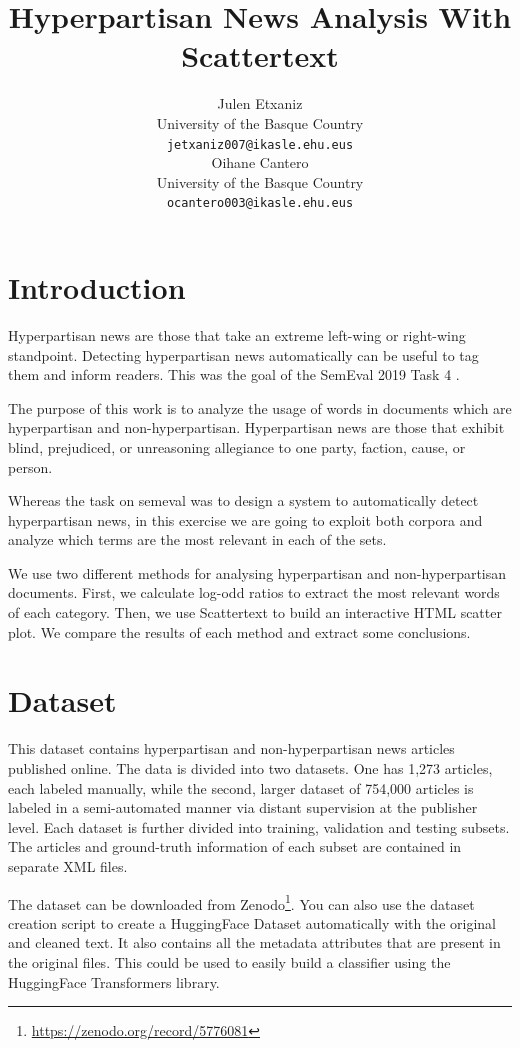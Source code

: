 \documentclass[11pt,a4paper]{article}
\title{Hyperpartisan News Analysis With Scattertext}
\author{Julen Etxaniz \\
  University of the Basque Country \\
  \texttt{jetxaniz007@ikasle.ehu.eus} \\\And
  Oihane Cantero \\
  University of the Basque Country \\
  \texttt{ocantero003@ikasle.ehu.eus} \\}
\date{}
\begin{document}
\maketitle
\begin{abstract}

\end{abstract}

\section{Introduction}

Hyperpartisan news are those that take an extreme left-wing or right-wing standpoint. Detecting hyperpartisan news automatically can be useful to tag them and inform readers. This was the goal of the SemEval 2019 Task 4 \cite{kiesel2019semeval}.

The purpose of this work is to analyze the usage of words in documents which are hyperpartisan and non-hyperpartisan. Hyperpartisan news are those that exhibit blind, prejudiced, or unreasoning allegiance to one party, faction, cause, or person.

Whereas the task on semeval was to design a system to automatically detect hyperpartisan news, in this exercise we are going to exploit both corpora and analyze which terms are the most relevant in each of the sets.

We use two different methods for analysing hyperpartisan and non-hyperpartisan documents. First, we calculate log-odd ratios to extract the most relevant words of each category. Then, we use Scattertext \cite{kessler2017scattertext} to build an interactive HTML scatter plot. We compare the results of each method and extract some conclusions.

\section{Dataset}

This dataset contains hyperpartisan and non-hyperpartisan news articles published online. The data is divided into two datasets. One has 1,273 articles, each labeled manually, while the second, larger dataset of 754,000 articles is labeled in a semi-automated manner via distant supervision at the publisher level. Each dataset is further divided into training, validation and testing subsets. The articles and ground-truth information of each subset are contained in separate XML files.

The dataset can be downloaded from Zenodo\footnote{\url{https://zenodo.org/record/5776081}}. You can also use the dataset creation script to create a HuggingFace Dataset automatically with the original and cleaned text. It also contains all the metadata attributes that are present in the original files. This could be used to easily build a classifier using the HuggingFace Transformers library.
\end{document}
